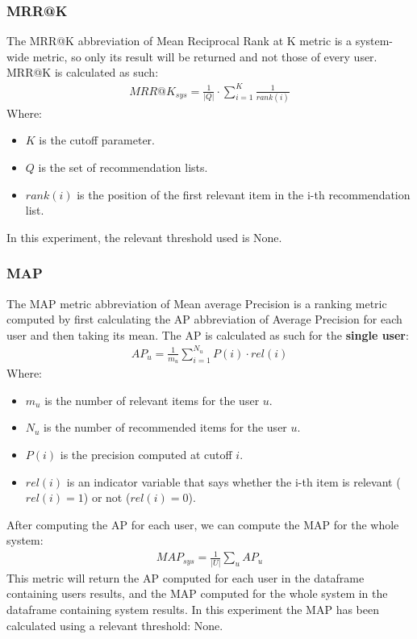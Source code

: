 \documentclass[11pt]{article}
\begin{document}
\subsubsection{MRR@K}\label{subsubsec:mrr-k}
The MRR@K abbreviation of Mean Reciprocal Rank at K metric is a system-wide metric, so only its result will be returned
and not those of every user.
MRR@K is calculated as such:
\hfill\break
\hfill\break
    \[
       \begin{gathered}
           MRR@K_{sys} = \frac{1}{|Q|}\cdot\sum_{i=1}^{K}\frac{1}{rank(i)}
       \end{gathered}
    \]
\hfill\break
\hfill\break
    Where:
\begin{itemize}
    \item $K$ is the cutoff parameter.
    \item $Q$ is the set of recommendation lists.
    \item $rank(i)$ is the position of the first relevant item in the i-th recommendation list.
\end{itemize}
\hfill\break
\hfill\break
In this experiment, the relevant threshold used is
None.
\hfill\break
\hfill\break

\subsubsection{MAP}\label{subsubsec:map}
The MAP metric abbreviation of Mean average Precision is a ranking metric computed by first calculating the AP
abbreviation of Average Precision for each user and then taking its mean.
The AP is calculated as such for the \textbf{single user}:
\hfill\break
\hfill\break
    \[
       \begin{gathered}
           AP_u = \frac{1}{m_u}\sum_{i=1}^{N_u}P(i)\cdot rel(i)
       \end{gathered}
    \]
\hfill\break
\hfill\break
    Where:
\begin{itemize}
    \item $m_u$ is the number of relevant items for the user $u$.
    \item $N_u$ is the number of recommended items for the user $u$.
    \item $P(i)$ is the precision computed at cutoff $i$.
    \item $rel(i)$ is an indicator variable that says whether the i-th item is relevant ($rel(i)=1$) or not ($rel(i)=0$).
\end{itemize}
\hfill\break
\hfill\break
After computing the AP for each user, we can compute the MAP for the whole system:
\hfill\break
\hfill\break
    \[
       \begin{gathered}
           MAP_{sys} = \frac{1}{|U|}\sum_{u}AP_u
       \end{gathered}
    \]
\hfill\break
\hfill\break
This metric will return the AP computed for each user in the dataframe containing users results, and the MAP
computed for the whole system in the dataframe containing system results.
In this experiment the MAP has been calculated using a relevant threshold:
None.
\hfill\break
\hfill\break
\end{document}
